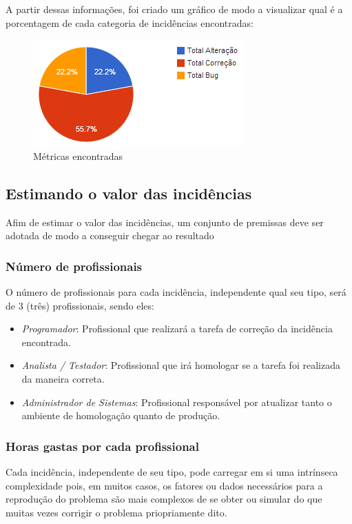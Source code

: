 \documentclass[11pt, a4paper]{article}
\begin{document}
A partir dessas informações, foi criado um gráfico de modo a visualizar qual é a porcentagem de cada categoria de incidências encontradas:

\begin{figure}[H]
  \caption{Métricas encontradas}
  \centering 
  \includegraphics{images/graphic.png}
\end{figure}
\cite{metricas-sao-silvestre}

\subsection{Estimando o valor das incidências}
Afim de estimar o valor das incidências, um conjunto de premissas deve ser adotada de modo a conseguir chegar ao resultado

\subsubsection{Número de profissionais}
O número de profissionais para cada incidência, independente qual seu tipo, será de 3 (três) profissionais, sendo eles:

\begin{itemize}
	\item \textit{Programador}: Profissional que realizará a tarefa de correção da incidência encontrada.
	\item \textit{Analista / Testador}: Profissional que irá homologar se a tarefa foi realizada da maneira correta.
	\item \textit{Administrador de Sistemas}: Profissional responsável por atualizar tanto o ambiente de homologação quanto de produção.
\end{itemize}

\subsubsection{Horas gastas por cada profissional}
Cada incidência, independente de seu tipo, pode carregar em si uma intrínseca complexidade pois, em muitos casos, os fatores ou dados necessários  para a reprodução do problema são mais complexos de se obter ou simular do que muitas vezes corrigir o problema priopriamente dito.
\end{document}
